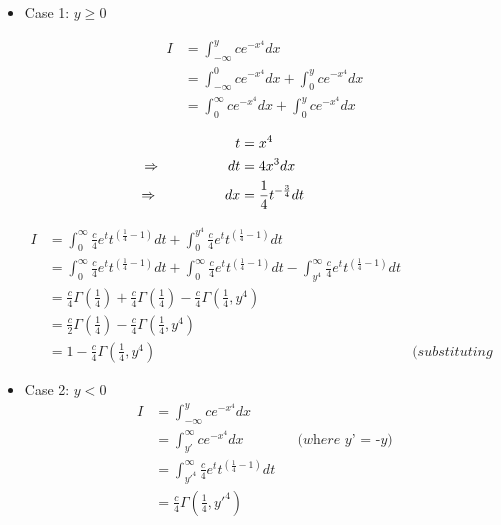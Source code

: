 \documentclass{article}
\theoremstyle{remark}
\begin{document}
\begin{itemize}

\item \large{Case 1: $y\geq 0$}

\begin{align*}
    I &= \int_{-\infty}^{y} c e^{-x^{4}} dx \\
    &= \int_{-\infty}^{0} c e^{-x^{4}} dx + \int_{0}^{y} c e^{-x^{4}} dx \\
    &= \int_{0}^{\infty} c e^{-x^{4}} dx + \int_{0}^{y} c e^{-x^{4}} dx \\
\end{align*}
\begin{align*}
  t&=x^4 \\
  \llap{$\Rightarrow$\hspace{50pt}} dt&=4x^3dx\\
  \llap{$\Rightarrow$\hspace{50pt}} dx &= \frac{1}{4} t^{-\frac{3}{4}} dt
\end{align*}

\begin{align*}
    I &= \int_{0}^{\infty} \frac{c}{4} e^{t} t^{(\frac{1}{4}-1)} dt + \int_{0}^{y^4} \frac{c}{4} e^{t} t^{(\frac{1}{4}-1)} dt\\
     &= \int_{0}^{\infty} \frac{c}{4} e^{t} t^{(\frac{1}{4}-1)} dt+ \int_{0}^{\infty} \frac{c}{4} e^{t} t^{(\frac{1}{4}-1)} dt - \int_{y^4}^{\infty} \frac{c}{4} e^{t} t^{(\frac{1}{4}-1)} dt\\
     &= \frac{c}{4} \Gamma(\frac{1}{4}) + \frac{c}{4} \Gamma(\frac{1}{4}) - \frac{c}{4} \Gamma(\frac{1}{4},y^4)\\
     &= \frac{c}{2}\Gamma(\frac{1}{4}) - \frac{c}{4} \Gamma(\frac{1}{4},y^4) \\
     &= 1 - \frac{c}{4} \Gamma(\frac{1}{4},y^4) &\textit{(substituting c)}
\end{align*}

\item \large{Case 2: $y < 0$}
\begin{align*}
    I &= \int_{-\infty}^{y} c e^{-x^{4}} dx \\
    &= \int_{{y}'}^{\infty} c e^{-x^{4}} dx &&\textit{(where {y}' = -y)}\\
    &= \int_{{y}'^4}^{\infty} \frac{c}{4} e^{t} t^{(\frac{1}{4}-1)} dt \\
    &= \frac{c}{4} \Gamma(\frac{1}{4},{y}'^4)
\end{align*}

\end{itemize}
\end{document}
